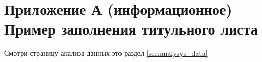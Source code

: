 \section*{Приложение А (информационное)  Пример заполнения титульного листа} 
 \pagebreak

Смотри страницу \pageref{sec:analysys_data} анализа данных
это раздел \ref{sec:analysys_data}

\begin{thebibliography}{99}
\end{thebibliography}

